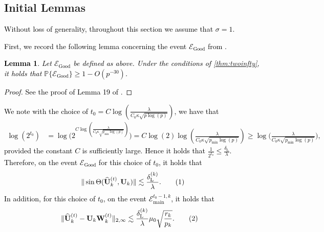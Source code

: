 \documentclass[10pt]{article}
\newcommand{\0}{{\mathbf{0}}}
\newcommand{\1}{{\mathbf{1}}}
\newcommand{\U}{{\mathbf{U}}}
\renewcommand{\citet}{\cite}
\newcommand{\uhat}{\mathbf{\hat{U}}}
\newtheorem{lemma}{Lemma}
\newcommand{\p}{\mathbb{P}}
\newcommand{\dl}{\delta_{\mathrm{L}}}
\renewcommand{\hat}{\widehat}
\newcommand\numberthis{\addtocounter{equation}{1}\tag{\theequation}}
\renewcommand{\hat}{\widehat}
\begin{document}
  \subsection{Initial Lemmas}
  \textcolor{black}{Without loss of generality, throughout this section we assume that $\sigma = 1$.  }  \textcolor{black}{First, we record the following lemma concerning the event $\mathcal{E}_{\mathrm{Good}}$ from \citet{agterberg_estimating_2022}.
  \begin{lemma}
      Let $\mathcal{E}_{\mathrm{Good}}$ be defined as above.  Under the conditions of \cref{thm:twoinfty}, it holds that $\p\{ \mathcal{E}_{\mathrm{Good}}\} \geq 1- O(p^{-30})$.  
  \end{lemma}
  \begin{proof}
  See the proof of Lemma 19 of \citet{agterberg_estimating_2022}.
  \end{proof}}
  \textcolor{black}{
 We note with the choice of $t_0 = C \log( \frac{\lambda}{C_0 \kappa \sqrt{p\log(p)}})$, we have that
  \begin{align*}
 \log(   2^{t_0} ) &=\log\bigg( 2^{C \log( \frac{\lambda}{C_0 \kappa \sqrt{p_{\min}\log(p)}})} \bigg) = C \log(2) \log( \frac{\lambda}{C_0 \kappa \sqrt{p_{\min}\log(p)}}) \geq \log\bigg( \frac{\lambda}{C_0 \kappa \sqrt{p_{\min}\log(p)}}\bigg),
  \end{align*}
  provided the constant $C$ is sufficiently large.  Hence it holds that $\frac{1}{2^{t_0}} \leq \frac{\dl}{\lambda}$.  Therefore, on the event $\mathcal{E}_{\mathrm{Good}}$ for this choice of $t_0$, it holds that
  \begin{align*}
      \| \sin\Theta(\uhat_k^{(t)}, \U_k ) \| \lesssim \frac{\dl^{(k)}}{\lambda}. \numberthis \label{sinthetaegood}
  \end{align*}
  In addition, for this choice of $t_0$, on the event $\mathcal{E}_{{\mathrm{main}}}^{t_0-1,k}$, it holds that
  \begin{align*}
      \| \uhat_k^{(t)} - \U_k \mathbf{W}_k^{(t)} \|_{2,\infty} &\lesssim \frac{\dl^{(k)}}{\lambda} \mu_0 \sqrt{\frac{r_k}{p_k}}.\numberthis \label{twoinftygood}
  \end{align*}
}
\end{document}
